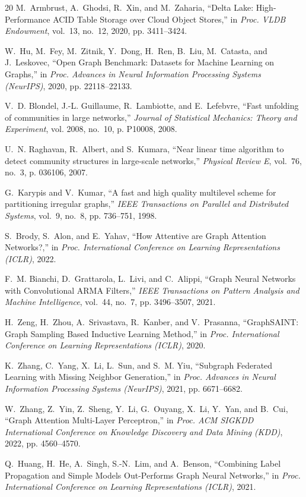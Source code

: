\documentclass[conference,compsoc]{IEEEtran}
\begin{document}
\begin{thebibliography}{20}
M.~Armbrust, A.~Ghodsi, R.~Xin, and M.~Zaharia, ``Delta Lake: High-Performance ACID Table Storage over Cloud Object Stores,'' in \emph{Proc. VLDB Endowment}, vol.~13, no.~12, 2020, pp. 3411--3424.

W.~Hu, M.~Fey, M.~Zitnik, Y.~Dong, H.~Ren, B.~Liu, M.~Catasta, and J.~Leskovec, ``Open Graph Benchmark: Datasets for Machine Learning on Graphs,'' in \emph{Proc. Advances in Neural Information Processing Systems (NeurIPS)}, 2020, pp. 22118--22133.

V.~D. Blondel, J.-L. Guillaume, R.~Lambiotte, and E.~Lefebvre, ``Fast unfolding of communities in large networks,'' \emph{Journal of Statistical Mechanics: Theory and Experiment}, vol. 2008, no.~10, p. P10008, 2008.

U.~N. Raghavan, R.~Albert, and S.~Kumara, ``Near linear time algorithm to detect community structures in large-scale networks,'' \emph{Physical Review E}, vol.~76, no.~3, p. 036106, 2007.

G.~Karypis and V.~Kumar, ``A fast and high quality multilevel scheme for partitioning irregular graphs,'' \emph{IEEE Transactions on Parallel and Distributed Systems}, vol.~9, no.~8, pp. 736--751, 1998.

S.~Brody, S.~Alon, and E.~Yahav, ``How Attentive are Graph Attention Networks?,'' in \emph{Proc. International Conference on Learning Representations (ICLR)}, 2022.

F.~M. Bianchi, D.~Grattarola, L.~Livi, and C.~Alippi, ``Graph Neural Networks with Convolutional ARMA Filters,'' \emph{IEEE Transactions on Pattern Analysis and Machine Intelligence}, vol.~44, no.~7, pp. 3496--3507, 2021.

H.~Zeng, H.~Zhou, A.~Srivastava, R.~Kanber, and V.~Prasanna, ``GraphSAINT: Graph Sampling Based Inductive Learning Method,'' in \emph{Proc. International Conference on Learning Representations (ICLR)}, 2020.

K.~Zhang, C.~Yang, X.~Li, L.~Sun, and S.~M. Yiu, ``Subgraph Federated Learning with Missing Neighbor Generation,'' in \emph{Proc. Advances in Neural Information Processing Systems (NeurIPS)}, 2021, pp. 6671--6682.

W.~Zhang, Z.~Yin, Z.~Sheng, Y.~Li, G.~Ouyang, X.~Li, Y.~Yan, and B.~Cui, ``Graph Attention Multi-Layer Perceptron,'' in \emph{Proc. ACM SIGKDD International Conference on Knowledge Discovery and Data Mining (KDD)}, 2022, pp. 4560--4570.

Q.~Huang, H.~He, A.~Singh, S.-N.~Lim, and A.~Benson, ``Combining Label Propagation and Simple Models Out-Performs Graph Neural Networks,'' in \emph{Proc. International Conference on Learning Representations (ICLR)}, 2021.
\end{thebibliography}
\end{document}
